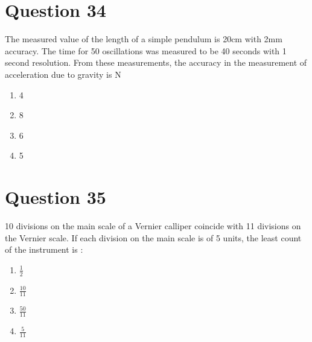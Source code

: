 \documentclass{article}
\begin{document}
\section*{Question 34}
The measured value of the length of a simple pendulum is 20cm with 2mm accuracy. The time for 50 oscillations was measured to be 40 seconds with 1 second resolution. From these measurements, the accuracy in the measurement of acceleration due to gravity is N%
\begin{enumerate}[label=(\alph*)]
\item 4
\item 8
\item 6
\item 5
\end{enumerate}
\newpage
\section*{Question 35}
10 divisions on the main scale of a Vernier calliper coincide with 11 divisions on the Vernier scale. If each division on the main scale is of 5 units, the least count of the instrument is : 
\begin{enumerate}[label=(\alph*)]
\item \(\frac{1}{2}\)
\item \(\frac{10}{11}\)
\item \(\frac{50}{11}\)
\item \(\frac{5}{11}\)
\end{enumerate}
\newpage
\end{document}
